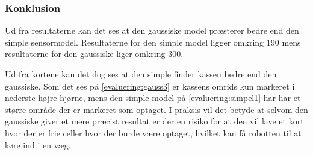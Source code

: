 \subsubsection*{Konklusion}
Ud fra resultaterne kan det ses at den gaussiske model præsterer bedre end den simple sensormodel. 
Resultaterne for den simple model ligger omkring 190 mens resultaterne for den gaussiske liger omkring 300.

Ud fra kortene kan det dog ses at den simple finder kassen bedre end den gaussiske.
Som det ses på \cref{evaluering:gauss3} er kassens omrids kun markeret i nederste højre hjørne, mens den simple model på \cref{evaluering:simpel1} har har et større område der er markeret som optaget.
I praksis vil det betyde at selvom den gaussiske giver et mere præcist resultat er der en risiko for at den vil lave et kort hvor der er frie celler hvor der burde være optaget, hvilket kan få robotten til at køre ind i en væg.
